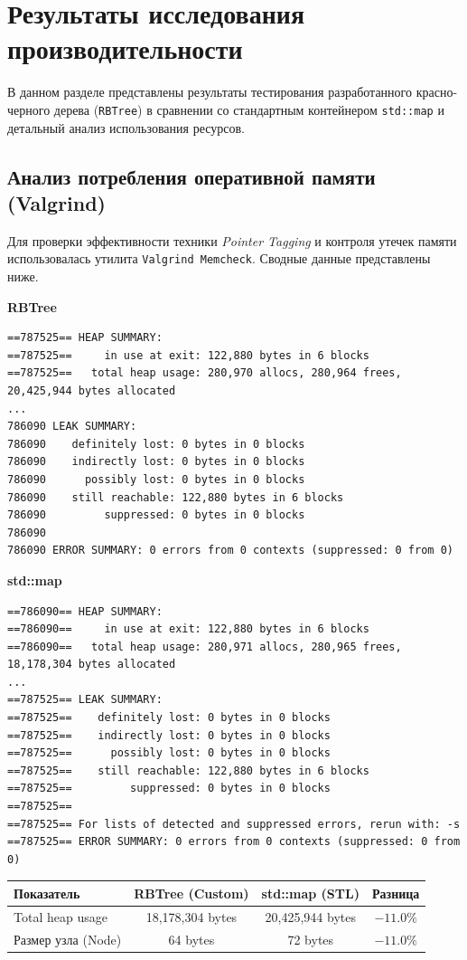 
\section{Результаты исследования производительности}

В данном разделе представлены результаты тестирования разработанного красно-черного дерева (\texttt{RBTree}) в сравнении со стандартным контейнером \texttt{std::map} и детальный анализ использования ресурсов.

\subsection{Анализ потребления оперативной памяти (Valgrind)}

Для проверки эффективности техники \textit{Pointer Tagging} и контроля утечек памяти использовалась утилита \texttt{Valgrind Memcheck}. Сводные данные представлены ниже.

\textbf{RBTree}
\begin{verbatim}
==787525== HEAP SUMMARY:
==787525==     in use at exit: 122,880 bytes in 6 blocks
==787525==   total heap usage: 280,970 allocs, 280,964 frees, 20,425,944 bytes allocated
...
786090 LEAK SUMMARY:
786090    definitely lost: 0 bytes in 0 blocks
786090    indirectly lost: 0 bytes in 0 blocks
786090      possibly lost: 0 bytes in 0 blocks
786090    still reachable: 122,880 bytes in 6 blocks
786090         suppressed: 0 bytes in 0 blocks
786090
786090 ERROR SUMMARY: 0 errors from 0 contexts (suppressed: 0 from 0)
\end{verbatim}


\textbf{std::map}
\begin{verbatim}
==786090== HEAP SUMMARY:
==786090==     in use at exit: 122,880 bytes in 6 blocks
==786090==   total heap usage: 280,971 allocs, 280,965 frees, 18,178,304 bytes allocated
...
==787525== LEAK SUMMARY:
==787525==    definitely lost: 0 bytes in 0 blocks
==787525==    indirectly lost: 0 bytes in 0 blocks
==787525==      possibly lost: 0 bytes in 0 blocks
==787525==    still reachable: 122,880 bytes in 6 blocks
==787525==         suppressed: 0 bytes in 0 blocks
==787525== 
==787525== For lists of detected and suppressed errors, rerun with: -s
==787525== ERROR SUMMARY: 0 errors from 0 contexts (suppressed: 0 from 0)
\end{verbatim}

\begin{table}[h!]
\centering
\renewcommand{\arraystretch}{1.2}
\begin{tabular}{@{}lccc@{}}
\toprule
\textbf{Показатель} & \textbf{RBTree (Custom)} & \textbf{std::map (STL)} & \textbf{Разница} \\ \midrule
Total heap usage & 18,178,304 bytes & 20,425,944 bytes & \textbf{$-11.0\%$} \\
Размер узла (Node) & 64 bytes & 72 bytes & \textbf{$-11.0\%$} \\ \bottomrule
\end{tabular}
\end{table}

